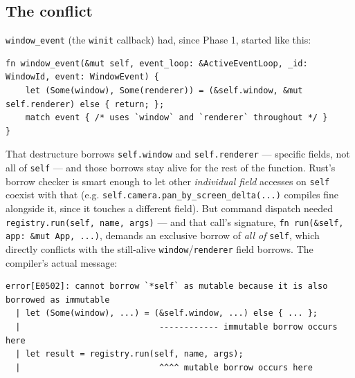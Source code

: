 \documentclass[11pt]{article}
\begin{document}
\subsection{The conflict}
\texttt{window\_event} (the \texttt{winit} callback) had, since Phase 1, started like this:
\begin{lstlisting}
fn window_event(&mut self, event_loop: &ActiveEventLoop, _id: WindowId, event: WindowEvent) {
    let (Some(window), Some(renderer)) = (&self.window, &mut self.renderer) else { return; };
    match event { /* uses `window` and `renderer` throughout */ }
}
\end{lstlisting}
That destructure borrows \texttt{self.window} and \texttt{self.renderer} — specific
fields, not all of \texttt{self} — and those borrows stay alive for the rest of the
function. Rust's borrow checker is smart enough to let other \emph{individual field}
accesses on \texttt{self} coexist with that (e.g. \texttt{self.camera.pan\_by\_screen\_delta(...)}
compiles fine alongside it, since it touches a different field). But command dispatch
needed \texttt{registry.run(self, name, args)} — and that call's signature,
\texttt{fn run(\&self, app: \&mut App, ...)}, demands an exclusive borrow of \emph{all of}
\texttt{self}, which directly conflicts with the still-alive \texttt{window}/\texttt{renderer}
field borrows. The compiler's actual message:
\begin{lstlisting}
error[E0502]: cannot borrow `*self` as mutable because it is also borrowed as immutable
  | let (Some(window), ...) = (&self.window, ...) else { ... };
  |                            ------------ immutable borrow occurs here
  | let result = registry.run(self, name, args);
  |                            ^^^^ mutable borrow occurs here
\end{lstlisting}
\end{document}
